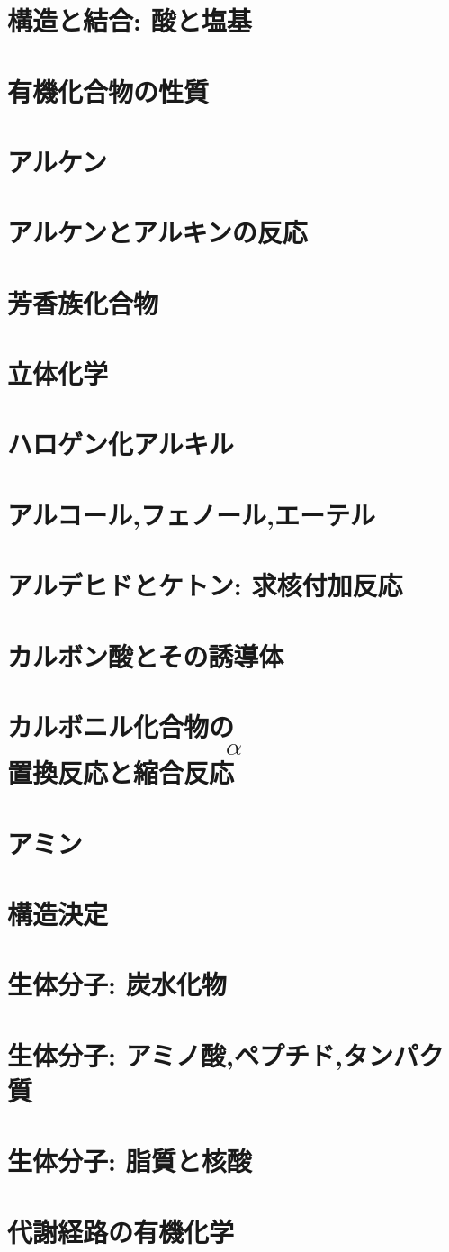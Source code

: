\documentclass[dvipdfmx,uplatex]{jsarticle}
\begin{document}
\section{構造と結合: 酸と塩基}
\section{有機化合物の性質}
\section{アルケン}
\section{アルケンとアルキンの反応}
\section{芳香族化合物}
\section{立体化学}
	
\section{ハロゲン化アルキル}
\section{アルコール,フェノール,エーテル}
\section{アルデヒドとケトン: 求核付加反応}
\section{カルボン酸とその誘導体}
\section{カルボニル化合物の$$\alpha$$置換反応と縮合反応}
\section{アミン}
\section{構造決定}
\section{生体分子: 炭水化物}
\section{生体分子: アミノ酸,ペプチド,タンパク質}
\section{生体分子: 脂質と核酸}
\section{代謝経路の有機化学}
\end{document}
